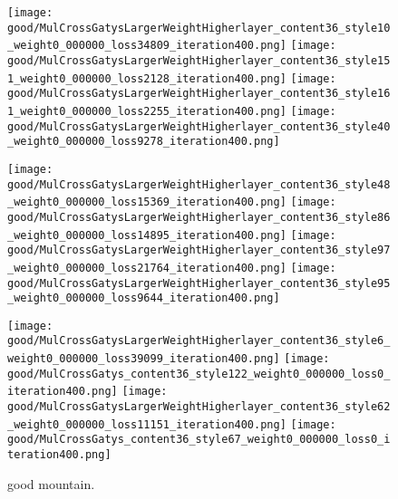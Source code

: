   \begin{figure*}[!htbp]
  \centering
  \small 
  
      \texttt{[image: good/MulCrossGatysLargerWeightHigherlayer\_content36\_style10\_weight0\_000000\_loss34809\_iteration400.png]}
      \texttt{[image: good/MulCrossGatysLargerWeightHigherlayer\_content36\_style151\_weight0\_000000\_loss2128\_iteration400.png]}
      \texttt{[image: good/MulCrossGatysLargerWeightHigherlayer\_content36\_style161\_weight0\_000000\_loss2255\_iteration400.png]}
      \texttt{[image: good/MulCrossGatysLargerWeightHigherlayer\_content36\_style40\_weight0\_000000\_loss9278\_iteration400.png]}
      
      \texttt{[image: good/MulCrossGatysLargerWeightHigherlayer\_content36\_style48\_weight0\_000000\_loss15369\_iteration400.png]}
      \texttt{[image: good/MulCrossGatysLargerWeightHigherlayer\_content36\_style86\_weight0\_000000\_loss14895\_iteration400.png]}
      \texttt{[image: good/MulCrossGatysLargerWeightHigherlayer\_content36\_style97\_weight0\_000000\_loss21764\_iteration400.png]}
      \texttt{[image: good/MulCrossGatysLargerWeightHigherlayer\_content36\_style95\_weight0\_000000\_loss9644\_iteration400.png]}
      
      \texttt{[image: good/MulCrossGatysLargerWeightHigherlayer\_content36\_style6\_weight0\_000000\_loss39099\_iteration400.png]}
      \texttt{[image: good/MulCrossGatys\_content36\_style122\_weight0\_000000\_loss0\_iteration400.png]}
      \texttt{[image: good/MulCrossGatysLargerWeightHigherlayer\_content36\_style62\_weight0\_000000\_loss11151\_iteration400.png]}
      \texttt{[image: good/MulCrossGatys\_content36\_style67\_weight0\_000000\_loss0\_iteration400.png]}
  \caption{good mountain.  }
  \label{fig:good1}
  \end{figure*}
  

